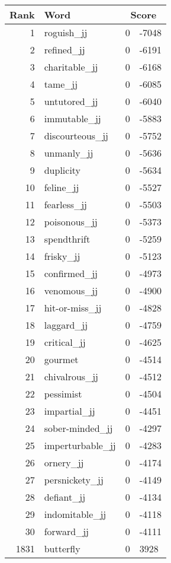 \begin{longtable}[!htbp]{| rlr@{.}l |}
    \hline
    \textbf{Rank} & \textbf{Word} & \multicolumn{2}{c|}{\textbf{Score}} \\
    \hline
    \endhead
    1 & roguish\_jj & 0 & -7048 \\
    2 & refined\_jj & 0 & -6191 \\
    3 & charitable\_jj & 0 & -6168 \\
    4 & tame\_jj & 0 & -6085 \\
    5 & untutored\_jj & 0 & -6040 \\
    6 & immutable\_jj & 0 & -5883 \\
    7 & discourteous\_jj & 0 & -5752 \\
    8 & unmanly\_jj & 0 & -5636 \\
    9 & duplicity & 0 & -5634 \\
    10 & feline\_jj & 0 & -5527 \\
    11 & fearless\_jj & 0 & -5503 \\
    12 & poisonous\_jj & 0 & -5373 \\
    13 & spendthrift & 0 & -5259 \\
    14 & frisky\_jj & 0 & -5123 \\
    15 & confirmed\_jj & 0 & -4973 \\
    16 & venomous\_jj & 0 & -4900 \\
    17 & hit-or-miss\_jj & 0 & -4828 \\
    18 & laggard\_jj & 0 & -4759 \\
    19 & critical\_jj & 0 & -4625 \\
    20 & gourmet & 0 & -4514 \\
    21 & chivalrous\_jj & 0 & -4512 \\
    22 & pessimist & 0 & -4504 \\
    23 & impartial\_jj & 0 & -4451 \\
    24 & sober-minded\_jj & 0 & -4297 \\
    25 & imperturbable\_jj & 0 & -4283 \\
    26 & ornery\_jj & 0 & -4174 \\
    27 & persnickety\_jj & 0 & -4149 \\
    28 & defiant\_jj & 0 & -4134 \\
    29 & indomitable\_jj & 0 & -4118 \\
    30 & forward\_jj & 0 & -4111 \\
    1831 & butterfly & 0 & 3928 \\

\end{longtable}
